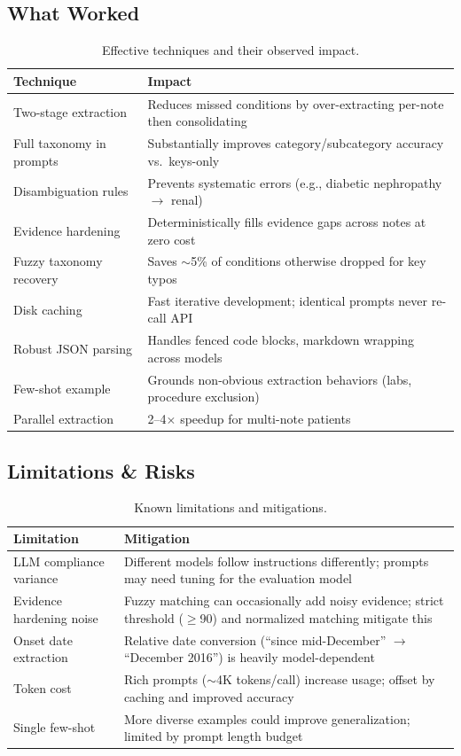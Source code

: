 \documentclass[11pt, a4paper]{article}
\begin{document}
\subsection{What Worked}

\begin{table}[H]
\centering
\caption{Effective techniques and their observed impact.}
\begin{tabularx}{\textwidth}{p{4cm}X}
\toprule
\textbf{Technique} & \textbf{Impact} \\
\midrule
Two-stage extraction & Reduces missed conditions by over-extracting per-note then consolidating \\
Full taxonomy in prompts & Substantially improves category/subcategory accuracy vs.\ keys-only \\
Disambiguation rules & Prevents systematic errors (e.g., diabetic nephropathy $\rightarrow$ renal) \\
Evidence hardening & Deterministically fills evidence gaps across notes at zero cost \\
Fuzzy taxonomy recovery & Saves $\sim$5\% of conditions otherwise dropped for key typos \\
Disk caching & Fast iterative development; identical prompts never re-call API \\
Robust JSON parsing & Handles fenced code blocks, markdown wrapping across models \\
Few-shot example & Grounds non-obvious extraction behaviors (labs, procedure exclusion) \\
Parallel extraction & 2--4$\times$ speedup for multi-note patients \\
\bottomrule
\end{tabularx}
\end{table}

\subsection{Limitations \& Risks}

\begin{table}[H]
\centering
\caption{Known limitations and mitigations.}
\begin{tabularx}{\textwidth}{p{4cm}X}
\toprule
\textbf{Limitation} & \textbf{Mitigation} \\
\midrule
LLM compliance variance & Different models follow instructions differently; prompts may need tuning for the evaluation model \\
Evidence hardening noise & Fuzzy matching can occasionally add noisy evidence; strict threshold ($\geq$90) and normalized matching mitigate this \\
Onset date extraction & Relative date conversion (``since mid-December'' $\rightarrow$ ``December 2016'') is heavily model-dependent \\
Token cost & Rich prompts ($\sim$4K tokens/call) increase usage; offset by caching and improved accuracy \\
Single few-shot & More diverse examples could improve generalization; limited by prompt length budget \\
\bottomrule
\end{tabularx}
\end{table}
\end{document}
